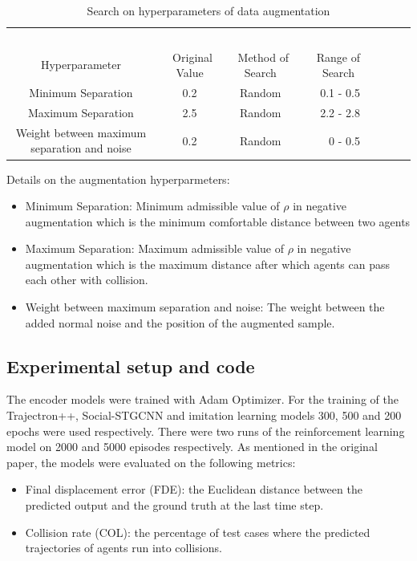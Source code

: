 {\begin{table}[H]
\caption{Search on hyperparameters of data augmentation}
\centering %
\begin{tabular}{ccc rrrrr} 
\hline 
&\ \ \ \ \ \\
Hyperparameter&\ Original Value&\ Method of Search&\ Range of Search\ \\ [0.5ex]
\hline 
Minimum Separation &  0.2 & Random & 0.1 - 0.5\\
Maximum Separation & 2.5 & Random & 2.2 - 2.8\\
Weight between maximum separation and noise &  0.2 & Random & 0 - 0.5\\
\hline
\end{tabular}
\label{tab:hresult}
\end{table}

Details on the augmentation hyperparmeters:
\begin{itemize}
    \item Minimum Separation: Minimum admissible value of $\rho$ in negative augmentation which is the minimum comfortable distance between two agents
    \item Maximum Separation: Maximum admissible value of $\rho$ in negative augmentation which is the maximum distance after which agents can pass each other with collision.
    \item Weight between maximum separation and noise: The weight between the added normal noise and the position of the augmented sample.
\end{itemize}

\subsection{Experimental setup and code}
The encoder models were trained with Adam Optimizer. For the training of the Trajectron++, Social-STGCNN and imitation learning models 300, 500 and 200 epochs were used respectively. There were two runs of the reinforcement learning model on 2000 and 5000 episodes respectively. As mentioned in the original paper, the models were evaluated on the following metrics:
\begin{itemize}
  \item Final displacement error (FDE): the Euclidean distance between the predicted output and the ground truth at the last time step.
  \item Collision rate (COL): the percentage of test cases where the predicted trajectories of agents run into collisions.
\end{itemize}

}
